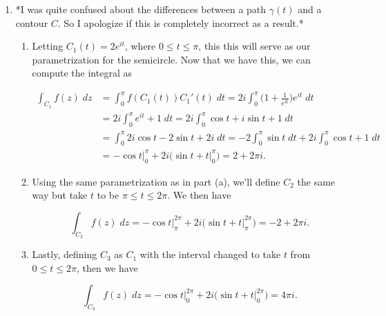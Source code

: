 \documentclass[12pt]{article}
\makeatletter
\theoremstyle{definition}
\theoremstyle{remark}
\newenvironment{solution}[1][\bf{\textit{Solution}}]{\par
  
  \normalfont \topsep6\p@\@plus6\p@\relax
  \list{}{\leftmargin=0mm
          \rightmargin=0mm
          \settowidth{\itemindent}{\itshape#1}%
          \labelwidth=\itemindent
          \parsep=0pt \listparindent=\parindent 
  }
  \item[\hskip\labelsep
        \itshape
    #1\@addpunct{.}]\ignorespaces
}{%
  \popQED\endlist\@endpefalse
}
\makeatother
\begin{document}
\begin{enumerate}[leftmargin=*]
    \begin{solution} *I was quite confused about the differences between a path $\gamma(t)$ and a contour $C$. So I apologize if this is completely incorrect as a result.* \hfill\par\hfill
        \begin{enumerate}[label=(\alph*)]
            \item Letting $C_1(t)=2e^{it}$, where $0\leq t\leq\pi$, this this will serve as our parametrization for the semicircle. Now that we have this, we can compute the integral as
            
            \begin{equation*}
                \begin{split}
                    \int_{C_1}f(z)\;dz &=\int_{0}^{\pi}f(C_1(t))C_1'(t)\;dt  =2i\int_{0}^{\pi}\bigg(1+\frac{1}{e^{it}}\bigg)e^{it}\;dt \\ 
                    &=2i\int_{0}^{\pi}e^{it}+1\;dt 
                    = 2i\int_{0}^{\pi}\cos{t}+i\sin{t}+1\;dt \\
                    &= \int_{0}^{\pi}2i\cos{t}-2\sin{t}+2i\;dt 
                    = -2\int_{0}^{\pi}\sin{t}\;dt +2i\int_{0}^{\pi}\cos{t}+1\;dt \\
                    &= -\cos{t}\bigg\rvert_{0}^{\pi}+2i\bigg(\sin{t}+t\bigg\rvert_{0}^{\pi}\bigg) = 2+2\pi i.
                \end{split}
            \end{equation*}
            
            \item Using the same parametrization as in part (a), we'll define $C_2$ the same way but take $t$ to be $\pi\leq t\leq 2\pi$. We then have
            
            \begin{equation*}
                \int_{C_2}f(z)\;dz = -\cos{t}\bigg\rvert_{\pi}^{2\pi}+2i\bigg(\sin{t}+t\bigg\rvert_{\pi}^{2\pi}\bigg) = -2+2\pi i.
            \end{equation*}
            
            \item Lastly, defining $C_3$ as $C_1$ with the interval changed to take $t$ from $0\leq t\leq 2\pi$, then we have
            
            \begin{equation*}
                \int_{C_3}f(z)\;dz = -\cos{t}\bigg\rvert_{0}^{2\pi}+2i\bigg(\sin{t}+t\bigg\rvert_{0}^{2\pi}\bigg) = 4\pi i.
            \end{equation*}
            

\end{enumerate}
\end{solution}
\end{enumerate}
\end{document}
